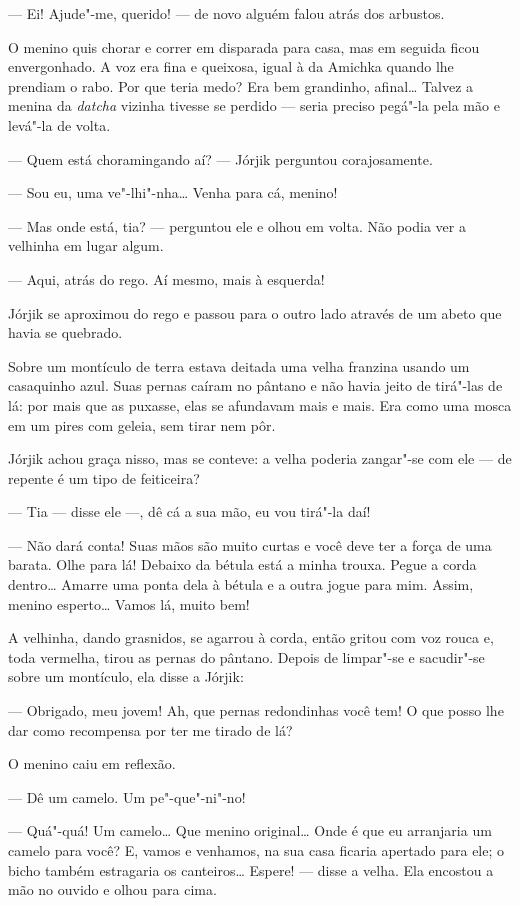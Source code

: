 --- Ei! Ajude"-me, querido! --- de novo alguém falou atrás dos arbustos.

O menino quis chorar e correr em disparada para casa, mas em seguida ficou
envergonhado. A voz era fina e queixosa, igual à da Amichka quando lhe
prendiam o rabo. Por que teria medo? Era bem grandinho, afinal\ldots{} Talvez
a menina da \emph{datcha} vizinha tivesse se perdido --- seria preciso
pegá"-la pela mão e levá"-la de volta.

--- Quem está choramingando aí? --- Jórjik perguntou corajosamente.

--- Sou eu, uma ve"-lhi"-nha\ldots{} Venha para cá, menino!

--- Mas onde está, tia? --- perguntou ele e olhou em volta. Não podia
ver a velhinha em lugar algum.

--- Aqui, atrás do rego. Aí mesmo, mais à esquerda!

Jórjik se aproximou do rego e passou para o outro lado através de um
abeto que havia se quebrado.

Sobre um montículo de terra estava deitada uma velha franzina usando um
casaquinho azul. Suas pernas caíram no pântano e não havia jeito de
tirá"-las de lá: por mais que as puxasse, elas se afundavam mais e mais.
Era como uma mosca em um pires com geleia, sem tirar nem pôr.

Jórjik achou graça nisso, mas se conteve: a velha poderia zangar"-se com
ele --- de repente é um tipo de feiticeira?

--- Tia --- disse ele ---, dê cá a sua mão, eu vou tirá"-la daí!

--- Não dará conta! Suas mãos são muito curtas e você deve ter a força
de uma barata. Olhe para lá! Debaixo da bétula está a minha trouxa.
Pegue a corda dentro\ldots{} Amarre uma ponta dela à bétula e a outra jogue
para mim. Assim, menino esperto\ldots{} Vamos lá, muito bem!

A velhinha, dando grasnidos, se agarrou à corda, então gritou com voz
rouca e, toda vermelha, tirou as pernas do pântano. Depois de limpar"-se
e sacudir"-se sobre um montículo, ela disse a Jórjik:

--- Obrigado, meu jovem! Ah, que pernas redondinhas você tem! O que
posso lhe dar como recompensa por ter me tirado de lá?

O menino caiu em reflexão.

--- Dê um camelo. Um pe"-que"-ni"-no!

--- Quá"-quá! Um camelo\ldots{} Que menino original\ldots{} Onde é que eu
arranjaria um camelo para você? E, vamos e venhamos, na sua casa ficaria
apertado para ele; o bicho também estragaria os canteiros\ldots{} Espere! ---
disse a velha. Ela encostou a mão no ouvido e olhou para cima.

